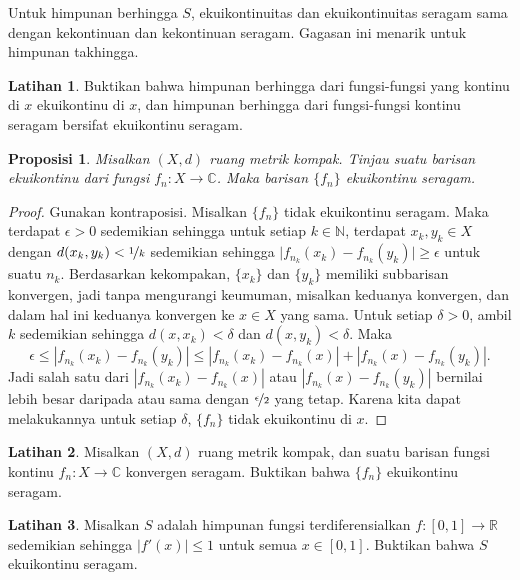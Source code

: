 \documentclass[12pt,openany]{book}
\newcommand{\sabs}[1]{\lvert {#1} \rvert}
\newcommand{\abs}[1]{\left\lvert {#1} \right\rvert}
\newcommand{\C}{{\mathbb{C}}}
\newcommand{\R}{{\mathbb{R}}}
\newcommand{\N}{{\mathbb{N}}}
\theoremstyle{plain}
\newtheorem{prop}[thm]{Proposisi}
\theoremstyle{remark}
\theoremstyle{definition}
\newenvironment{exbox}{%
    \def\FrameCommand{\vrule width 1pt \relax\hspace{10pt}}%
    \MakeFramed{\advance\hsize-\width\FrameRestore}%
}{%
    \endMakeFramed
}
\theoremstyle{exercise}
\newtheorem{exercise}{Latihan}[section]
\theoremstyle{example}
\begin{document}
Untuk himpunan berhingga $S$, ekuikontinuitas dan ekuikontinuitas seragam
sama dengan kekontinuan dan kekontinuan seragam.
Gagasan ini menarik untuk himpunan takhingga.

\begin{exbox}
\begin{exercise}
Buktikan bahwa himpunan berhingga dari fungsi-fungsi yang kontinu di $x$
ekuikontinu di $x$, dan
himpunan berhingga dari fungsi-fungsi kontinu seragam bersifat ekuikontinu seragam.
\end{exercise}
\end{exbox}

\begin{prop}
Misalkan $(X,d)$ ruang metrik kompak.
Tinjau suatu
barisan ekuikontinu dari fungsi
$f_n \colon X \to \C$.
Maka barisan $\{ f_n \}$ ekuikontinu seragam.
\end{prop}

\begin{proof}
Gunakan kontraposisi.  Misalkan $\{ f_n \}$ tidak
ekuikontinu seragam.  Maka terdapat $\epsilon > 0$
sedemikian sehingga untuk setiap $k \in \N$, terdapat
$x_k,y_k \in X$ dengan $d(x_k,y_k) < \nicefrac{1}{k}$
sedemikian sehingga $\sabs{f_{n_k}(x_k)-f_{n_k}(y_k)} \geq \epsilon$ untuk suatu $n_k$.
Berdasarkan kekompakan, $\{x_k\}$ dan $\{ y_k\}$ memiliki subbarisan konvergen, jadi
tanpa mengurangi keumuman, misalkan keduanya konvergen, dan dalam hal ini
keduanya konvergen ke $x \in X$ yang sama.
Untuk setiap $\delta > 0$, ambil $k$ sedemikian sehingga
$d(x,x_k) < \delta$ dan
$d(x,y_k) < \delta$.
Maka
\begin{equation*}
\epsilon \leq 
\abs{f_{n_k}(x_k)-f_{n_k}(y_k)}
\leq
\abs{f_{n_k}(x_k)-f_{n_k}(x)} + \abs{f_{n_k}(x)-f_{n_k}(y_k)} .
\end{equation*}
Jadi salah satu dari 
$\abs{f_{n_k}(x_k)-f_{n_k}(x)}$ atau $\abs{f_{n_k}(x)-f_{n_k}(y_k)}$ bernilai
lebih besar daripada atau sama dengan $\nicefrac{\epsilon}{2}$ yang tetap.
Karena kita dapat melakukannya untuk setiap $\delta$,
$\{ f_n \}$ tidak ekuikontinu di $x$.
\end{proof}

\begin{exbox}
\begin{exercise}
Misalkan $(X,d)$ ruang metrik kompak,
dan suatu barisan fungsi kontinu $f_n \colon X \to \C$
konvergen seragam. Buktikan bahwa $\{ f_n \}$ ekuikontinu seragam.
\end{exercise}

\begin{exercise}
Misalkan $S$ adalah himpunan fungsi terdiferensialkan $f \colon [0,1] \to \R$
sedemikian sehingga $\sabs{f'(x)} \leq 1$ untuk semua $x \in [0,1]$.
Buktikan bahwa $S$ ekuikontinu seragam.
\end{exercise}
\end{exbox}
\end{document}
